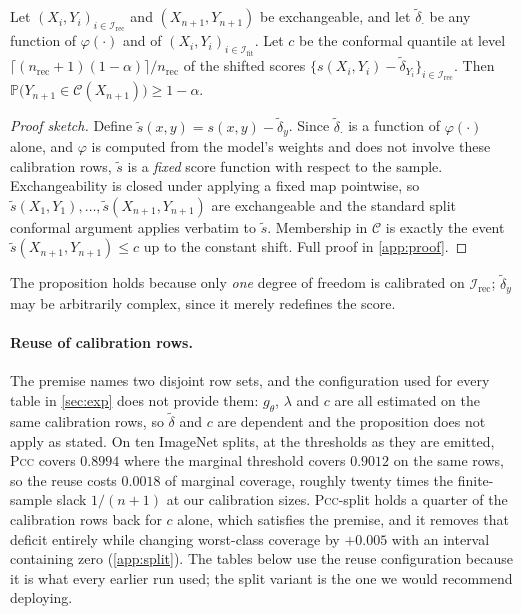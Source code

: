 \begin{proposition}
\label{prop:marginal}
Let $(X_i,Y_i)_{i\in\mathcal{I}_{\mathrm{rec}}}$ and $(X_{n+1},Y_{n+1})$ be exchangeable, and
let $\tilde\delta_\cdot$ be any function of $\varphi(\cdot)$ and of
$(X_i,Y_i)_{i\in\mathcal{I}_{\mathrm{fit}}}$. Let $c$ be the conformal quantile at level
$\lceil (n_{\mathrm{rec}}+1)(1-\alpha)\rceil/n_{\mathrm{rec}}$ of the shifted scores
$\{s(X_i,Y_i)-\tilde\delta_{Y_i}\}_{i\in\mathcal{I}_{\mathrm{rec}}}$. Then
$\mathbb{P}\bigl(Y_{n+1}\in\mathcal{C}(X_{n+1})\bigr)\ge 1-\alpha$.
\end{proposition}

\begin{proof}[Proof sketch]
Define $\tilde s(x,y)=s(x,y)-\tilde\delta_y$. Since $\tilde\delta_\cdot$ is a function of
$\varphi(\cdot)$ alone, and $\varphi$ is computed from the model's weights and does not involve
these calibration rows, $\tilde s$ is a \emph{fixed} score function with respect to the
sample. Exchangeability is closed under applying a fixed map pointwise, so
$\tilde s(X_1,Y_1),\dots,\tilde s(X_{n+1},Y_{n+1})$ are exchangeable and the standard split
conformal argument applies verbatim to $\tilde s$. Membership in $\mathcal{C}$ is exactly the
event $\tilde s(X_{n+1},Y_{n+1})\le c$ up to the constant shift. Full proof in
\cref{app:proof}.
\end{proof}

The proposition holds because only \emph{one} degree of freedom is calibrated on
$\mathcal{I}_{\mathrm{rec}}$; $\tilde\delta_y$ may be arbitrarily complex, since it merely
redefines the score.

\paragraph{Reuse of calibration rows.} The premise names two disjoint row sets, and the
configuration used for every table in \cref{sec:exp} does not provide them: $g_\theta$,
$\lambda$ and $c$ are all estimated on the same calibration rows, so $\tilde\delta$ and $c$ are
dependent and the proposition does not apply as stated. On ten ImageNet splits, at the thresholds as they are
emitted, \textsc{Pcc} covers $0.8994$ where the marginal threshold covers $0.9012$ on the same
rows, so the reuse costs $0.0018$ of marginal coverage, roughly twenty times the finite-sample
slack $1/(n+1)$ at our calibration sizes. \textsc{Pcc}-split holds a quarter of the calibration
rows back for $c$ alone, which satisfies the premise, and it removes that deficit entirely
while changing worst-class coverage by $+0.005$ with an interval containing zero
(\cref{app:split}). The tables below use the reuse configuration because it is what every
earlier run used; the split variant is the one we would recommend deploying.

